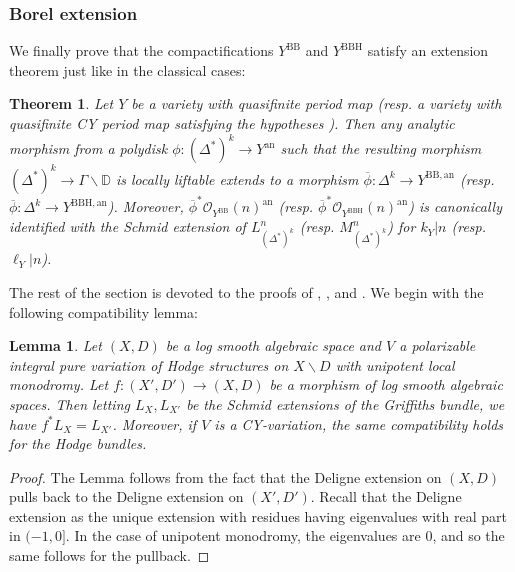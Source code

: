 \documentclass{amsart}
\newcommand{\bs}{\backslash}
\newcommand{\an}{\operatorname{an}}
\newcommand{\ol}{\overline}
\newtheorem{lem}[theorem]{Lemma}
\newtheorem{thm}[theorem]{Theorem}
\theoremstyle{definition}
\theoremstyle{remark}
\def\bD{\mathbb{D}}
\def\cO{\mathcal{O}}
\def\an{\mathrm{an}}
\def\BB{\mathrm{BB}}
\renewcommand{\bar}[1]{\ol{#1}}
\def\BBH{\mathrm{BBH}}
\numberwithin{equation}{section}
\begin{document}
\subsubsection{Borel extension}
We finally prove that the compactifications $Y^\BB$ and $Y^\BBH$ satisfy an extension theorem just like in the classical cases:

\begin{thm}\label{thm:bbextensino}Let $Y$ be a variety with quasifinite period map (resp. a variety with quasifinite CY period map satisfying the hypotheses ).  Then any analytic morphism from a polydisk $\phi:(\Delta^*)^k\to Y^{\an}$ such that the resulting morphism $(\Delta^*)^k\to \Gamma\bs\bD$ is locally liftable extends to a morphism $\ol{\phi}:\Delta^k\to Y^{\BB,\an}$ (resp. $\ol{\phi}:\Delta^k\to Y^{\BBH,\an}$).  Moreover, $\bar\phi^*\cO_{Y^\BB}(n)^\an$ (resp. $\bar\phi^*\cO_{Y^\BBH}(n)^\an$) is canonically identified with the Schmid extension of $L_{(\Delta^*)^k}^n$ (resp. $M_{(\Delta^*)^k}^n$) for $k_Y|n$ (resp. $\ell_Y|n$).
\end{thm}

The rest of the section is devoted to the proofs of , , and . We begin with the following compatibility lemma:

\begin{lem}\label{lem:unipgriffithspullback}
Let $(X,D)$ be a log smooth algebraic space and $V$ a polarizable integral pure variation of Hodge structures on $X\bs D$ with unipotent local monodromy. Let $f:(X',D')\to (X,D)$ be a morphism of log smooth algebraic spaces. Then letting $L_X,L_{X'}$ be the Schmid extensions of the Griffiths bundle, we have $f^*L_X=L_{X'}$.  Moreover, if $V$ is a CY-variation, the same compatibility holds for the Hodge bundles.

\end{lem}

\begin{proof}

The Lemma follows from the fact that the Deligne extension on $(X,D)$ pulls back to the Deligne extension on $(X',D')$. Recall that the Deligne extension as the unique extension with residues having eigenvalues with real part in $(-1,0]$. In the case of unipotent monodromy, the eigenvalues are $0$, and so the same follows for the pullback.
\end{proof}
\end{document}
